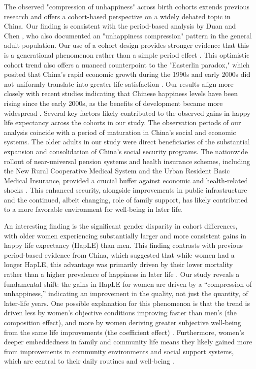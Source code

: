 \documentclass[12pt, a4paper]{article}
\begin{document}
The observed "compression of unhappiness" across birth cohorts extends previous research and offers a cohort-based perspective on a widely debated topic in China. Our finding  is consistent with the period-based analysis by Duan and Chen \autocite{duan.2020.happy}, who also documented an "unhappiness compression" pattern in the general adult population. Our use of a cohort design provides stronger evidence that this is a generational phenomenon rather than a simple period effect \autocite{payne.2022.expansion}. This optimistic cohort trend also offers a nuanced counterpoint to the "Easterlin paradox," which posited that China’s rapid economic growth during the 1990s and early 2000s did not uniformly translate into greater life satisfaction \autocite{easterlin.2012.chinas}. Our results align more closely with recent studies indicating that Chinese happiness levels have been rising since the early 2000s, as the benefits of development became more widespread \autocite{wang.2023.hierarchical,cai.2023.does}. Several key factors likely contributed to the observed gains in happy life expectancy across the cohorts in our study. The observation periods of our analysis coincide with a period of maturation in China's social and economic systems. The older adults in our study were direct beneficiaries of the substantial expansion and consolidation of China's social security programs. The nationwide rollout of near-universal pension systems and health insurance schemes, including the New Rural Cooperative Medical System and the Urban Resident Basic Medical Insurance, provided a crucial buffer against economic and health-related shocks \autocite{liu.2019.are}. This enhanced security, alongside improvements in public infrastructure and the continued, albeit changing, role of family support, has likely contributed to a more favorable environment for well-being in later life.

An interesting finding is the significant gender disparity in cohort differences, with older women experiencing substantially larger and more consistent gains in happy life expectancy (HapLE) than men. This finding contrasts with previous period-based evidence from China, which suggested that while women had a longer HapLE, this advantage was primarily driven by their lower mortality rather than a higher prevalence of happiness in later life \autocite{duan.2020.happy}. Our study reveals a fundamental shift: the gains in HapLE for women are driven by a “compression of unhappiness,” indicating an improvement in the quality, not just the quantity, of later-life years. One possible explanation for this phenomenon is that the trend is driven less by women’s objective conditions improving faster than men’s (the composition effect), and more by women deriving greater subjective well-being from the same life improvements (the coefficient effect) \autocite{yang.2024.gender}. Furthermore, women’s deeper embeddedness in family and community life means they likely gained more from improvements in community environments and social support systems, which are central to their daily routines and well-being \autocite{feng.2024.gender}.
\end{document}
